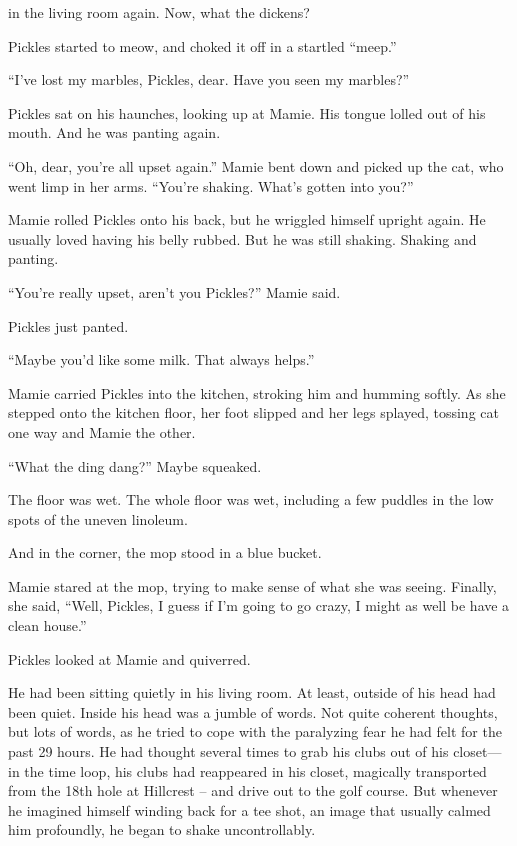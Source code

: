 
 in the living room again. Now, what the dickens?

Pickles started to meow, and choked it off in a startled “meep.”

“I’ve lost my marbles, Pickles, dear. Have you seen my marbles?”

Pickles sat on his haunches, looking up at Mamie. His tongue lolled out of his mouth. And he was panting again.

“Oh, dear, you’re all upset again.” Mamie bent down and picked up the cat, who went limp in her arms. “You’re shaking. What’s gotten into you?”

Mamie rolled Pickles onto his back, but he wriggled himself upright again. He usually loved having his belly rubbed. But he was still shaking. Shaking and panting.

“You’re really upset, aren’t you Pickles?” Mamie said.

Pickles just panted.

“Maybe you’d like some milk. That always helps.”

Mamie carried Pickles into the kitchen, stroking him and humming softly. As she stepped onto the kitchen floor, her foot slipped and her legs splayed, tossing cat one way and Mamie the other.

“What the ding dang?” Maybe squeaked.

The floor was wet. The whole floor was wet, including a few puddles in the low spots of the uneven linoleum.

And in the corner, the mop stood in a blue bucket.

Mamie stared at the mop, trying to make sense of what she was seeing. Finally, she said, “Well, Pickles, I guess if I’m going to go crazy, I might as well be have a clean house.”

Pickles looked at Mamie and quiverred.




 He had been sitting quietly in his living room. At least, outside of his head had been quiet. Inside his head was a jumble of words. Not quite coherent thoughts, but lots of words, as he tried to cope with the paralyzing fear he had felt for the past 29 hours. He had thought several times to grab his clubs out of his closet—in the time loop, his clubs had reappeared in his closet, magically transported from the 18th hole at Hillcrest – and drive out to the golf course. But whenever he imagined himself winding back for a tee shot, an image that usually calmed him profoundly, he began to shake uncontrollably.

